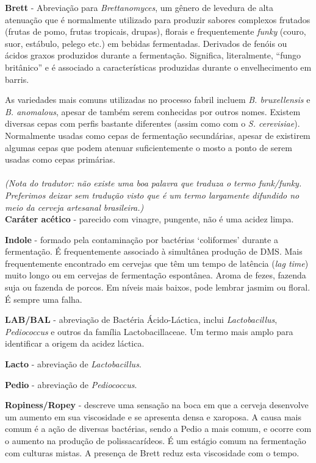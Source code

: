 \textbf{Brett} - Abreviação para \textit{Brettanomyces}, um gênero de levedura de alta atenuação que é normalmente utilizado para produzir sabores complexos frutados (frutas de pomo, frutas tropicais, drupas), florais e frequentemente \textit{funky} (couro, suor, estábulo, pelego etc.) em bebidas fermentadas. Derivados de fenóis ou ácidos graxos produzidos durante a fermentação. Significa, literalmente, “fungo britânico” e é associado a características produzidas durante o envelhecimento em barris.

As variedades mais comuns utilizadas no processo fabril incluem \textit{B. bruxellensis} e \textit{B. anomalous}, apesar de também serem conhecidas por outros nomes. Existem diversas cepas com perfis bastante diferentes (assim como com o \textit{S. cerevisiae}). Normalmente usadas como cepas de fermentação secundárias, apesar de existirem algumas cepas que podem atenuar suficientemente o mosto a ponto de serem usadas como cepas primárias.\\\\
\textit{(Nota do tradutor: não existe uma boa palavra que traduza o termo funk/funky. Preferimos deixar sem tradução visto que é um termo largamente difundido no meio da cerveja artesanal brasileira.)}\\

\textbf{Caráter acético} - parecido com vinagre, pungente, não é uma acidez limpa.

\textbf{Indole} - formado pela contaminação por bactérias ‘coliformes’ durante a fermentação. É frequentemente associado à simultânea produção de DMS. Mais frequentemente encontrado em cervejas que têm um tempo de latência (\textit{lag time}) muito longo ou em cervejas de fermentação espontânea. Aroma de fezes, fazenda suja ou fazenda de porcos. Em níveis mais baixos, pode lembrar jasmim ou floral. É sempre uma falha.

\textbf{LAB/BAL} - abreviação de Bactéria Ácido-Láctica, inclui \textit{Lactobacillus}, \textit{Pediococcus} e outros da família Lactobacillaceae. Um termo mais amplo para identificar a origem da acidez láctica.

\textbf{Lacto} - abreviação de \textit{Lactobacillus}.

\textbf{Pedio} - abreviação de \textit{Pediococcus}.

\textbf{Ropiness/Ropey} - descreve uma sensação na boca em que a cerveja desenvolve um aumento em sua viscosidade e se apresenta densa e xaroposa. A causa mais comum é a ação de diversas bactérias, sendo a Pedio a mais comum, e ocorre com o aumento na produção de polissacarídeos. É um estágio comum na fermentação com culturas mistas. A presença de Brett reduz esta viscosidade com o tempo.

